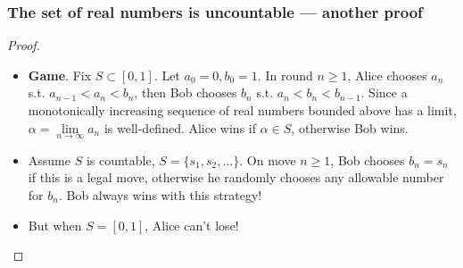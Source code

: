 \documentclass[UTF8,aspectratio=43,11pt,colorlinks,compress,openany]{beamer}%
\begin{document}
\begin{frame}\frametitle{The set of real numbers is uncountable --- another proof}
	\begin{proof}
		\begin{itemize}
			\item \textbf{Game}. Fix $S\subset [0,1]$. Let $a_0=0, b_0=1$. In round $n\geq 1$, Alice chooses $a_n$ s.t. $a_{n-1}<a_n<b_n$, then Bob chooses $b_n$ s.t. $a_n<b_n<b_{n-1}$. Since a monotonically increasing sequence of real numbers bounded above has a limit, $\alpha=\lim\limits_{n\to\infty}a_n$ is well-defined. Alice wins if $\alpha\in S$, otherwise Bob wins.
			\item Assume $S$ is countable, $S=\{s_1, s_2, \dots\}$. On move $n\geq 1$, Bob chooses $b_n=s_n$ if this is a legal move, otherwise he randomly chooses any allowable number for $b_n$. Bob always wins with this strategy!
			\item But when $S=[0,1]$, Alice can't lose!
		\end{itemize}
	\end{proof}
\end{frame}
\end{document}
